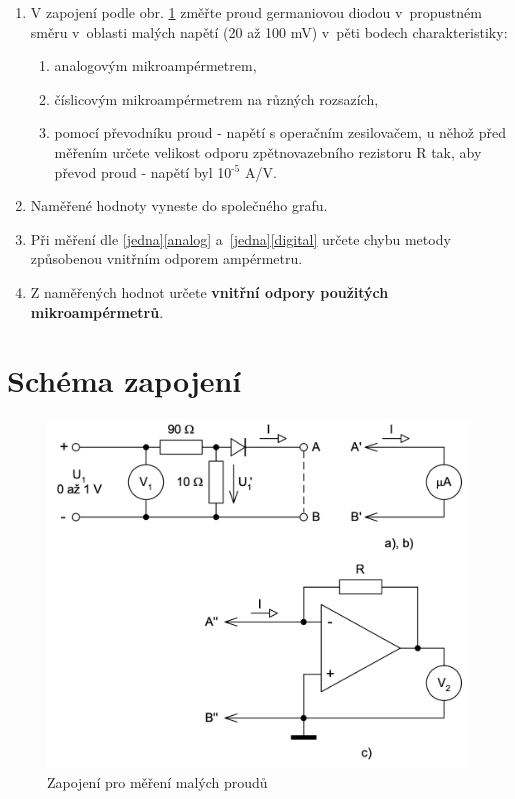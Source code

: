 \documentclass[a4paper,12pt]{article}   %
\newcommand{\texp}[1]{$^\textrm{#1}$}
\begin{document}
\label{zadani}
\begin{enumerate}
    \item V zapojení podle obr. \ref{fig:schema} změřte proud germaniovou diodou v~propustném směru v~oblasti malých napětí (20 až 100 mV) v~pěti bodech charakteristiky:\label{jedna}
    \begin{enumerate}[label=\alph*)]
        \item analogovým mikroampérmetrem,\label{analog}
        \item číslicovým mikroampérmetrem na různých rozsazích,\label{digital}
        \item pomocí převodníku proud - napětí s operačním zesilovačem, u něhož před měřením určete velikost odporu zpětnovazebního rezistoru R tak, aby převod proud - napětí byl 10\texp{-5} A/V.
    \end{enumerate}
    \item Naměřené hodnoty vyneste do společného grafu.
    \item Při měření dle \ref{jedna}\ref{analog} a~\ref{jedna}\ref{digital} určete chybu metody způsobenou vnitřním odporem ampérmetru.
    \item Z naměřených hodnot určete \textbf{vnitřní odpory použitých mikroampérmetrů}.
\end{enumerate}



\section{Schéma zapojení}

\label{schema_zapojeni}
\begin{figure}[h!]
    \centering
    \includegraphics[width=.8\textwidth]{schema.png}
    \caption{Zapojení pro měření malých proudů \cite{navod}}
    \label{fig:schema}
\end{figure}
\end{document}
